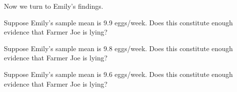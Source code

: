 \documentclass{ximera}
\begin{document}
\begin{problem}
    

Now we turn to Emily's findings.

\begin{question}Suppose Emily's sample mean is 9.9 eggs/week.  Does this constitute enough evidence that Farmer Joe is lying?
\begin{multipleChoice}
\end{multipleChoice}
\end{question}

\begin{question}Suppose Emily's sample mean is 9.8 eggs/week.  Does this constitute enough evidence that Farmer Joe is lying?
\begin{multipleChoice}
\end{multipleChoice}
\end{question}

\begin{question}Suppose Emily's sample mean is 9.6 eggs/week.  Does this constitute enough evidence that Farmer Joe is lying?
\begin{multipleChoice}
\end{multipleChoice}
\end{question}

\end{problem}
\end{document}
